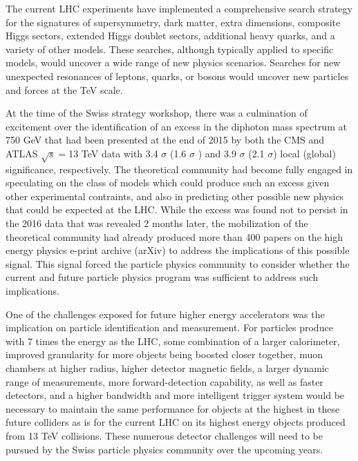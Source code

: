 \noindent The current LHC experiments have implemented a comprehensive search strategy for the signatures of supersymmetry, dark matter, extra dimensions, composite Higgs sectors, extended Higgs doublet sectors, additional heavy quarks, and a variety of other models.  These searches, although typically applied to specific models, would uncover a wide range of new physics scenarios.  Searches for new unexpected resonances of leptons, quarks, or bosons would uncover new particles and forces at the TeV scale.  

\medskip
\noindent  At the time of the Swiss strategy workshop, there was a culmination of excitement over the identification of an excess in the diphoton mass spectrum at 750 GeV that had been presented at the end of 2015 by both the CMS and ATLAS $\sqrt{s}=$13 TeV data with 3.4 $\sigma$ (1.6 $\sigma$ ) and 3.9 $\sigma$ (2.1 $\sigma$) local (global) significance, respectively.  The theoretical community had become fully engaged in speculating on the class of models which could produce such an excess given other experimental contraints, and also in predicting other possible new physics that could be expected at the LHC.   While the excess was found not to persist in the 2016 data that was revealed 2 months later, the mobilization of the theoretical community had already produced more than 400 papers on the high energy physics e-print archive (arXiv) to address the implications of this possible signal. 
This signal forced the particle physics community to consider whether the current and future particle physics program was sufficient to address such implications.
\medskip

\noindent One of the challenges exposed for future higher energy accelerators was the implication on particle identification and measurement. For particles produce with 7 times the energy as the LHC, some combination of a larger calorimeter, improved granularity for more objects being boosted closer together, muon chambers at higher radius, higher detector magnetic fields, a larger dynamic range of measurements, more forward-detection capability, as well as faster detectors, and a higher bandwidth and more intelligent trigger system would be necessary to maintain the same performance for objects at the highest in these future colliders as is for the current LHC on its highest energy objects produced from 13 TeV collisions.   These numerous detector challenges will need to be pursued by the Swiss particle physics community over the upcoming years. 
\medskip

